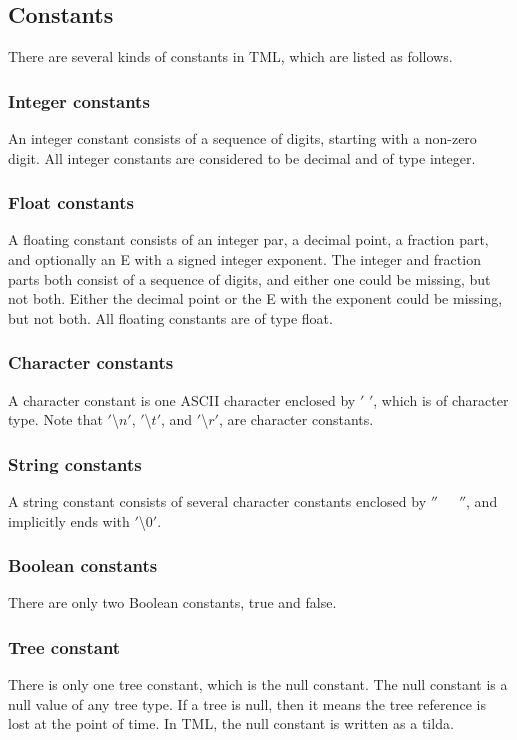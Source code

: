 \documentclass[12pt,psfig,a4]{article}
\begin{document}
\subsection {Constants}
There are several kinds of constants in TML, which are listed as follows.
\subsubsection {Integer constants}
An integer constant consists of a sequence of digits, starting with a non-zero digit. All integer constants are considered to be decimal and of type integer.

\subsubsection {Float constants}
A floating constant consists of an integer par, a decimal point, a fraction part, and optionally an E with a signed integer exponent. The integer and fraction parts both consist of a sequence of digits, and either one could be missing, but not both. Either the decimal point or the E with the exponent could be missing, but not both. All floating constants are of type float.

\subsubsection {Character constants}
A character constant is one ASCII character enclosed by $'$ $'$, which is of character type. Note that $'$\textbackslash$n'$, $'$\textbackslash$t'$, and $'$\textbackslash$r'$, are character constants.

\subsubsection {String constants}
A string constant consists of several character constants enclosed by $''$~~~$''$, and implicitly ends with $'$\textbackslash$0'$.

\subsubsection {Boolean constants}
There are only two Boolean constants, true and false.

\subsubsection {Tree constant}
There is only one tree constant, which is the null constant. The null constant is a null value of any tree type. If a tree is null, then it means the tree reference is lost at the point of time. In TML, the null constant is written as a tilda.
\end{document}
